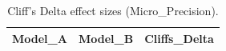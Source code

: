 \begin{table}[t]
\centering
\begin{tabular}{lll}
\toprule
Model_A & Model_B & Cliffs_Delta \\
\midrule
\bottomrule
\end{tabular}
\caption{Cliff's Delta effect sizes (Micro_Precision).}
\label{tab:cliffs_Micro_Precision}
\end{table}